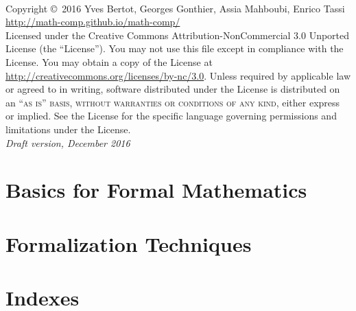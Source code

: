 \newpage
~\vfill
\thispagestyle{empty}

\noindent Copyright \copyright\ 2016 Yves Bertot, Georges Gonthier, Assia Mahboubi, Enrico Tassi\\ %


\noindent \url{http://math-comp.github.io/math-comp/}\\ %

\noindent Licensed under the Creative Commons Attribution-NonCommercial 3.0 Unported License (the ``License''). You may not use this file except in compliance with the License. You may obtain a copy of the License at \url{http://creativecommons.org/licenses/by-nc/3.0}. Unless required by applicable law or agreed to in writing, software distributed under the License is distributed on an \textsc{``as is'' basis, without warranties or conditions of any kind}, either express or implied. See the License for the specific language governing permissions and limitations under the License.\\ %

\noindent \textit{Draft version, December 2016} %





\tableofcontents{}

\part{Basics for Formal Mathematics}\label{part:defproofs}






\part{Formalization Techniques}\label{part:form}






% 
% 
% 
% 
% 
% 
% 

\part{Indexes}

\printindex[concept]
\printindex[ssr]
\printindex[coq]
\printindex[vernac]





